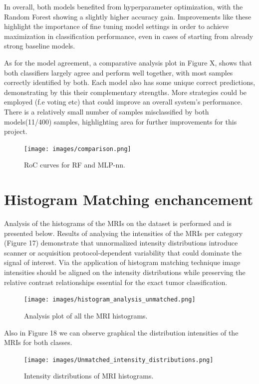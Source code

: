 \documentclass[11pt,a4paper]{article}
\begin{document}
		In overall, both models benefited from hyperparameter optimization, 
		with the Random Forest showing a slightly higher accuracy gain. 
		Improvements like these highlight the importance of fine tuning model settings 
		in order to achieve maximization in classification performance, 
		even in cases of starting from already strong baseline models.
		

		As for the model agreement, a comparative analysis plot in Figure X, 
		shows that both classifiers largely agree and perform well together, 
		with most samples correctly identified by both.
		Each model also has some unique correct predictions, 
		demonstrating by this their complementary strengths.
		More strategies could be employed (f.e voting etc) that could improve an overall
		system's performance.
		There is a relatively small number of samples misclassified by both models(11/400) samples,
		highlighting area for further improvements for this project.
		
		\begin{figure}[H]
			\centering
			\texttt{[image: images/comparison.png]}
			\caption{RoC curves for RF and MLP-nn.}
			\label{fig1:}
		\end{figure}		


\section{Histogram Matching enchancement}


Analysis of the histograms of the MRIs on the dataset is performed
and is presented below. Results of analysing the intensities of the 
MRIs per category (Figure 17)
demonstrate that unnormalized intensity distributions introduce scanner 
or acquisition protocol-dependent variability that
could dominate the signal of interest. 
Via the application of histogram matching technique image 
intensities should be aligned on the intensity distributions 
while preserving the relative contrast relationships 
essential for the exact tumor classification.

		\begin{figure}[H]
			\centering
			\texttt{[image: images/histogram\_analysis\_unmatched.png]}
			\caption{Analysis plot of all the MRI histograms.}
			\label{fig1:}
		\end{figure}		


Also in Figure 18 we can observe graphical the distribution intensities of the MRIs for both classes.
		\begin{figure}[H]
			\centering
			\texttt{[image: images/Unmatched\_intensity\_distributions.png]}
			\caption{Intensity distributions of MRI histograms.}
			\label{fig1:}
		\end{figure}		
\end{document}
